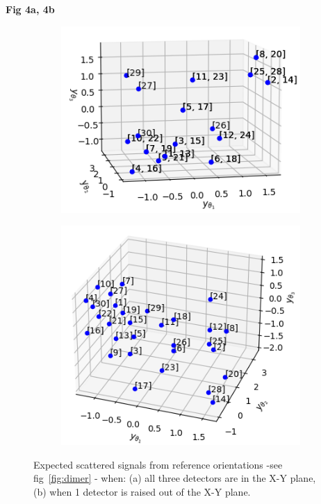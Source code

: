 \documentclass[final,  3p]{elsarticle}
\begin{document}
\begin{center}
	\bf{Fig 4a, 4b}
\end{center}
\begin{figure}[h]
	\centering
	\begin{subfigure}{0.49\textwidth}
		\subcaption{}
		\includegraphics[width=\textwidth]{./Images/fig4a.png}
	\end{subfigure}
	\begin{subfigure}{0.4\textwidth}
		\subcaption{}
		\includegraphics[width=\textwidth]{./Images/fig4b.png}
	\end{subfigure}
	\caption{Expected scattered signals from reference orientations -see fig~\ref{fig:dimer} - when: (a) all three detectors are in the X-Y plane, (b) when 1 detector is raised out of the X-Y plane.}
	\label{fig:detectors}
\end{figure}
\end{document}

